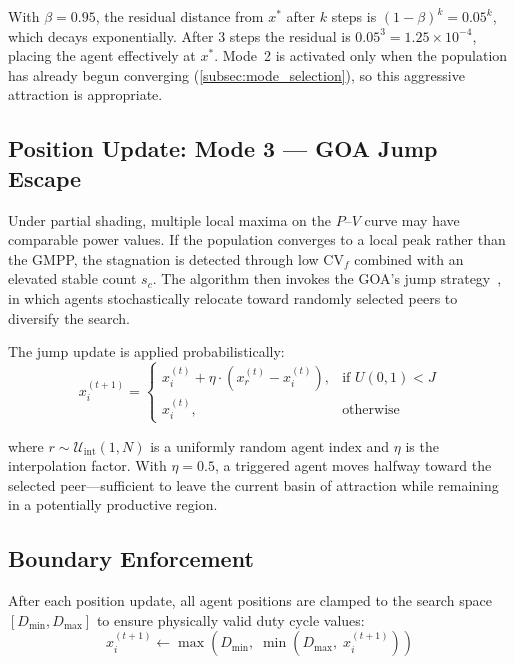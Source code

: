 \documentclass[a4paper, 12pt]{article}
\begin{document}
With $\beta = 0.95$, the residual distance from $x^{*}$ after $k$ steps is $(1 - \beta)^k = 0.05^k$, which decays exponentially. After 3 steps the residual is $0.05^3 = 1.25 \times 10^{-4}$, placing the agent effectively at $x^{*}$. Mode~2 is activated only when the population has already begun converging (\cref{subsec:mode_selection}), so this aggressive attraction is appropriate.


\subsection{Position Update: Mode 3 --- GOA Jump Escape}
\label{subsec:mode3}

Under partial shading, multiple local maxima on the $P$--$V$ curve may have comparable power values. If the population converges to a local peak rather than the GMPP, the stagnation is detected through low $\mathrm{CV}_f$ combined with an elevated stable count $s_c$. The algorithm then invokes the GOA's jump strategy~\cite{nozari2025goa}, in which agents stochastically relocate toward randomly selected peers to diversify the search.

The jump update is applied probabilistically:
\begin{equation}
    x_i^{(t+1)} =
    \begin{cases}
        x_i^{(t)} + \eta \cdot \left( x_r^{(t)} - x_i^{(t)} \right), & \text{if } U(0,1) < J \\[4pt]
        x_i^{(t)}, & \text{otherwise}
    \end{cases}
    \label{eq:goa_jump}
\end{equation}

where $r \sim \mathcal{U}_{\text{int}}(1, N)$ is a uniformly random agent index and $\eta$ is the interpolation factor. With $\eta = 0.5$, a triggered agent moves halfway toward the selected peer---sufficient to leave the current basin of attraction while remaining in a potentially productive region.


\subsection{Boundary Enforcement}
\label{subsec:boundary}

After each position update, all agent positions are clamped to the search space $[D_{\min}, D_{\max}]$ to ensure physically valid duty cycle values:
\begin{equation}
    x_i^{(t+1)} \leftarrow \max\!\left( D_{\min},\; \min\!\left( D_{\max},\; x_i^{(t+1)} \right) \right)
    \label{eq:boundary}
\end{equation}
\end{document}
